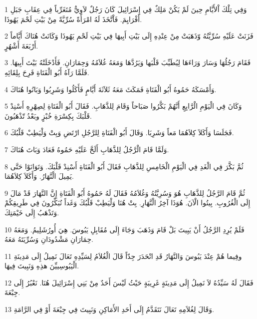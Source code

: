 \par 1 وَفِي تِلْكَ اْلأَيَّامِ حِينَ لَمْ يَكُنْ مَلِكٌ فِي إِسْرَائِيلَ كَانَ رَجُلٌ لاَوِيٌّ مُتَغَرِّباً فِي عِقَابِ جَبَلِ أَفْرَايِمَ. فَاْتَّخَذَ لَهُ امْرَأَةً سُرِّيَّةً مِنْ بَيْتِ لَحْمَ يَهُوذَا.
\par 2 فَزَنَتْ عَلَيْهِ سُرِّيَّتُهُ وّذَهَبَتْ مِنْ عِنْدِهِ إِلَى بَيْتِ أَبِيهَا فِي بَيْتِ لَحْمِ يَهُوذَا وَكَانَتْ هُنَاكَ أَيَّاماً أَرْبَعَةَ أَشْهُرٍ.
\par 3 فَقَامَ رَجُلُهَا وَسَارَ وَرَاءَهَا لِيُطَيِّبَ قَلْبَها وَيَرُدَّهَا وَمَعَهُ غُلاَمُهُ وَحِمَارَانِ. فَأَدْخَلَتْهُ بَيْتَ أَبِيهَا. فَلَمَّا رَآهُ أَبُو الْفَتَاةِ فَرِحَ بِلِقَائِهِ.
\par 4 وَأَمْسَكَهُ حَمُوهُ أَبُو الْفَتَاةِ فَمَكَثَ مَعَهُ ثَلاَثَةَ أَيَّامٍ فَأَكَلُوا وَشَرِبُوا وَبَاتُوا هُنَاكَ.
\par 5 وَكَانَ فِي الْيَوْمِ الْرَّابِعِ أَنَّهُمْ بَكَّرُوا صَبَاحاً وَقَامَ لِلذَّهَابِ. فَقَالَ أَبُو الْفَتَاةِ لِصِهْرِهِ أَسْنِدْ قَلْبَكَ بِكِسْرَةِ خُبْزٍ وبَعْدُ تّذْهَبُونَ.
\par 6 فَجَلَسَا وَأَكَلاَ كِلاَهُمَا مَعاً وَشَرِبَا. وَقَالَ أَبُو الْفَتَاةِ لِلرَّجُلِ ارْتَضِ وَبِتْ وَلْيَطِبْ قَلْبُكَ.
\par 7 وَلَمَّا قَامَ الْرَّجُلُ لِلذَّهَابِ أَلَحَّ عَلَيْهِ حَمُوهُ فَعَادَ وَبَاتَ هُنَاكَ.
\par 8 ثُمَّ بَكَّرَ فِي الْغَدِ فِي الْيَوْمِ الْخَامِسِ لِلذَّهَابِ فَقَالَ أَبُو الْفَتَاةِ أَسْنِدْ قَلْبَكَ. وَتَوَانَوْا حَتَّى يَمِيلَ الْنَّهَارُ. وَأَكَلاَ كِلاَهُمَا.
\par 9 ثُمَّ قَامَ الرَّجُلُ لِلذَّهَابِ هُوَ وَسُرِيَّتُهُ وَغُلاَمُهُ فَقَالَ لَهُ حَمُوهُ أَبُو الْفَتَاةِ إِنَّ النَّهَارَ قَدْ مَالَ إِلَى الْغُرُوبِ. بِيتُوا الْآنَ. هُوَذَا آخِرُ الْنَّهَارِ. بِتْ هُنَا وَلْيَطِبْ قَلْبُكَ وَغَداً تُبَكِّرُونَ فِي طَرِيقِكُمْ وَتَذْهَبُ إِلَى خَيْمَتِكَ.
\par 10 فَلَمْ يُرِدِ الرَّجُلُ أَنْ يَبِيتَ بَلْ قَامَ وَذَهَبَ وَجَاءَ إِلَى مُقَابِلِ يَبُوسَ. هِيَ أُورُشَلِيمُ. وَمَعَهُ حِمَارَانِ مَشْدُودَانِ وَسُرِّيَتَهُ مَعَهُ.
\par 11 وفِيما هُمْ عِنْدَ يَبُوسَ وَالنَّهَارُ قَدِ انْحَدَرَ جِدّاً قَالَ الْغُلاَمُ لِسَيِّدِهِ تَعَالَ نَمِيلُ إِلَى مَدِينَةِ الْيَبُوسِييِّنَ هذِهِ وَنَبِيتَ فِيهَا.
\par 12 فَقَالَ لَهُ سَيِّدُهُ لاَ نَمِيلُ إِلَى مَدِينَةٍ غَرِيبَةٍ حَيْثُ لَيْسَ أَحَدٌ مِنْ بَنِي إِسْرَائِيلَ هُنَا. نَعْبُرُ إِلَى جِبْعَةَ.
\par 13 وَقَالَ لِغُلاَمِهِ تَعَالَ نَتَقَدَّمُ إِلَى أَحَدِ الأَمَاكِنِ وَنَبِيتَ فِي جِبْعَةَ أَوْ فِي الرَّامَةِ.
